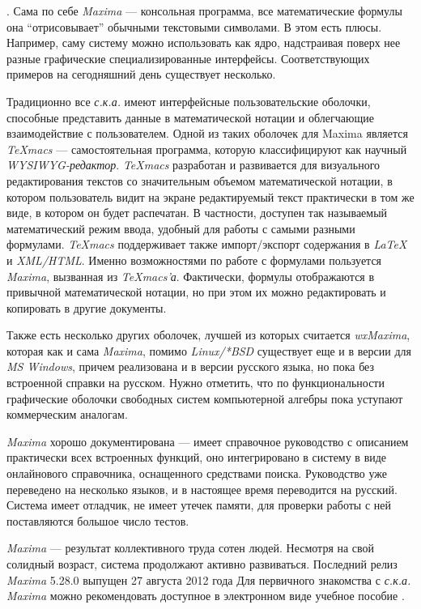 . Сама по себе \textit{Maxima} --- консольная программа, все математические формулы она “отрисовывает” обычными текстовыми символами. В этом есть плюсы. Например, саму систему можно использовать как ядро, надстраивая поверх нее разные графические специализированные интерфейсы. Соответствующих примеров на сегодняшний день существует несколько.

Традиционно все \textit{с.к.а.} имеют интерфейсные пользовательские оболочки, способные представить данные в математической нотации и облегчающие взаимодействие с пользователем. Одной из таких оболочек для Maxima является \textit{TeXmacs} --- самостоятельная программа, которую классифицируют как научный \textit{WYSIWYG-редактор}. \textit{TeXmacs} разработан и развивается для визуального редактирования текстов со значительным объемом математической нотации, в котором пользователь видит на экране редактируемый текст практически в том же виде, в котором он будет распечатан. В частности, доступен так называемый математический режим ввода, удобный для работы с самыми разными формулами. \textit{TeXmacs} поддерживает также импорт/экспорт содержания в \textit{LaTeX} и \textit{XML/HTML}. Именно возможностями по работе с формулами пользуется \textit{Maxima}, вызванная из \textit{TeXmacs’а}. Фактически, формулы отображаются в привычной математической нотации, но при этом их можно редактировать и копировать в другие документы.

Также есть несколько других оболочек, лучшей из которых считается \textit{wxMaxima}, которая как и сама \textit{Maxima}, помимо \textit{Linux/*BSD} существует еще и в версии для \textit{MS Windows}, причем реализована и в версии русского языка, но пока без встроенной справки на русском. Нужно отметить, что по функциональности графические оболочки свободных систем компьютерной алгебры пока уступают коммерческим аналогам.

\textit{Maxima} хорошо документирована --- имеет справочное руководство с описанием практически всех встроенных функций, оно интегрировано в систему в виде онлайнового справочника, оснащенного средствами поиска. Руководство уже переведено на несколько языков, и в настоящее время переводится на русский. Система имеет отладчик, не имеет утечек памяти, для проверки работы с ней поставляются большое число тестов.

\textit{Maxima} --- результат коллективного труда сотен людей. Несмотря на свой солидный возраст, система продолжают активно развиваться. Последний релиз \textit{Maxima} 5.28.0 выпущен 27 августа 2012 года Для первичного знакомства с \textit{с.к.а.} \textit{Maxima} можно рекомендовать доступное в электронном виде учебное пособие .

